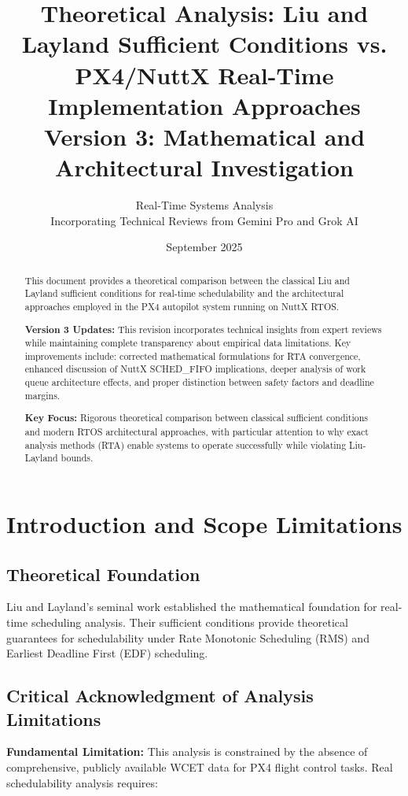 \documentclass[12pt,a4paper]{article}
\title{Theoretical Analysis: Liu and Layland Sufficient Conditions vs. PX4/NuttX Real-Time Implementation Approaches\\
\large{Version 3: Mathematical and Architectural Investigation}}
\author{Real-Time Systems Analysis\\
\small{Incorporating Technical Reviews from Gemini Pro and Grok AI}}
\date{September 2025}
\begin{document}
\maketitle

\begin{abstract}
This document provides a theoretical comparison between the classical Liu and Layland sufficient conditions for real-time schedulability and the architectural approaches employed in the PX4 autopilot system running on NuttX RTOS.

\textbf{Version 3 Updates:} This revision incorporates technical insights from expert reviews while maintaining complete transparency about empirical data limitations. Key improvements include: corrected mathematical formulations for RTA convergence, enhanced discussion of NuttX SCHED\_FIFO implications, deeper analysis of work queue architecture effects, and proper distinction between safety factors and deadline margins.

\textbf{Key Focus:} Rigorous theoretical comparison between classical sufficient conditions and modern RTOS architectural approaches, with particular attention to why exact analysis methods (RTA) enable systems to operate successfully while violating Liu-Layland bounds.
\end{abstract}

\section{Introduction and Scope Limitations}

\subsection{Theoretical Foundation}

Liu and Layland's seminal work \cite{liu1973scheduling} established the mathematical foundation for real-time scheduling analysis. Their sufficient conditions provide theoretical guarantees for schedulability under Rate Monotonic Scheduling (RMS) and Earliest Deadline First (EDF) scheduling.

\subsection{Critical Acknowledgment of Analysis Limitations}

\textbf{Fundamental Limitation:} This analysis is constrained by the absence of comprehensive, publicly available WCET data for PX4 flight control tasks. Real schedulability analysis requires:
\end{document}
